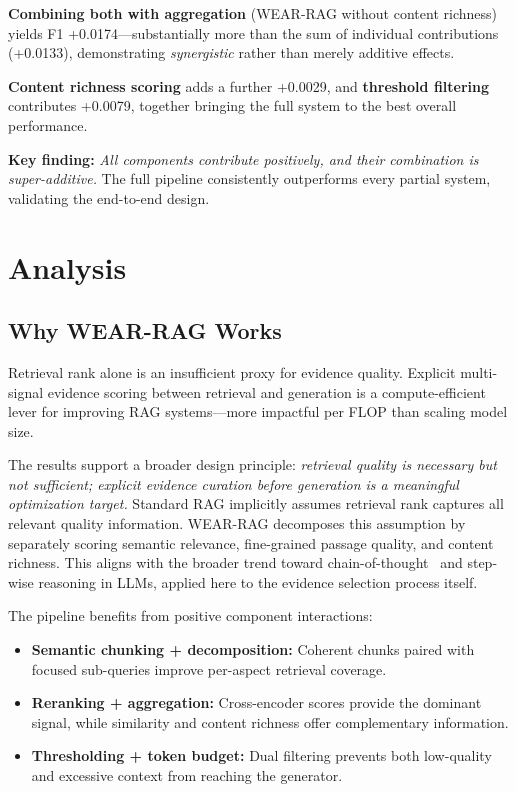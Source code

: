 \documentclass[conference]{IEEEtran}
\begin{document}
\textbf{Combining both with aggregation} (WEAR-RAG without content richness) yields F1 +0.0174---substantially more than the sum of individual contributions (+0.0133), demonstrating \textit{synergistic} rather than merely additive effects.

\textbf{Content richness scoring} adds a further +0.0029, and \textbf{threshold filtering} contributes +0.0079, together bringing the full system to the best overall performance.

\textbf{Key finding:} \textit{All components contribute positively, and their combination is super-additive.} The full pipeline consistently outperforms every partial system, validating the end-to-end design.

\section{Analysis}

\subsection{Why WEAR-RAG Works}

\begin{tcolorbox}[colback=blue!3!white, colframe=blue!50!black, title=Key Insight, fonttitle=\bfseries]
Retrieval rank alone is an insufficient proxy for evidence quality. Explicit multi-signal evidence scoring between retrieval and generation is a compute-efficient lever for improving RAG systems---more impactful per FLOP than scaling model size.
\end{tcolorbox}

The results support a broader design principle: \textit{retrieval quality is necessary but not sufficient; explicit evidence curation before generation is a meaningful optimization target.} Standard RAG implicitly assumes retrieval rank captures all relevant quality information. WEAR-RAG decomposes this assumption by separately scoring semantic relevance, fine-grained passage quality, and content richness. This aligns with the broader trend toward chain-of-thought~\cite{wei2022chain} and step-wise reasoning in LLMs, applied here to the evidence selection process itself.

The pipeline benefits from positive component interactions:
\begin{itemize}[leftmargin=*]
\item \textbf{Semantic chunking + decomposition:} Coherent chunks paired with focused sub-queries improve per-aspect retrieval coverage.
\item \textbf{Reranking + aggregation:} Cross-encoder scores provide the dominant signal, while similarity and content richness offer complementary information.
\item \textbf{Thresholding + token budget:} Dual filtering prevents both low-quality and excessive context from reaching the generator.
\end{itemize}
\end{document}
